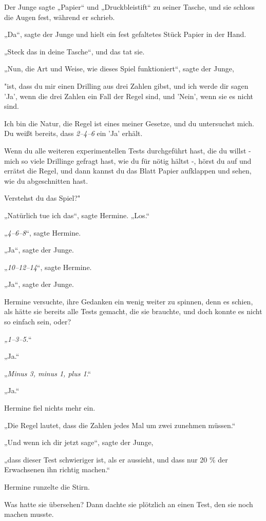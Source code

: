{Der Junge sagte „Papier“ und „Druckbleistift“ zu seiner Tasche, und sie schloss die Augen fest, während er schrieb.

„Da“, sagte der Junge und hielt ein fest gefaltetes Stück Papier in der Hand.

„Steck das in deine Tasche“, und das tat sie.

„Nun, die Art und Weise, wie dieses Spiel funktioniert“, sagte der Junge,

"ist, dass du mir einen Drilling aus drei Zahlen gibst, und ich werde dir sagen 'Ja', wenn die drei Zahlen ein Fall der Regel sind, und 'Nein', wenn sie es nicht sind.

Ich bin die Natur, die Regel ist eines meiner Gesetze, und du untersuchst mich. Du weißt bereits, dass \emph{2–4–6} ein 'Ja' erhält.

Wenn du alle weiteren experimentellen Tests durchgeführt hast, die du willst - mich so viele Drillinge gefragt hast, wie du für nötig hältst -, hörst du auf und errätst die Regel, und dann kannst du das Blatt Papier aufklappen und sehen, wie du abgeschnitten hast.

Verstehst du das Spiel?"

„Natürlich tue ich das“, sagte Hermine. „Los.“

„\emph{4–6–8}“, sagte Hermine.

„Ja“, sagte der Junge.

„\emph{10–12–14}“, sagte Hermine.

„Ja“, sagte der Junge.

Hermine versuchte, ihre Gedanken ein wenig weiter zu spinnen, denn es schien, als hätte sie bereits alle Tests gemacht, die sie brauchte, und doch konnte es nicht so einfach sein, oder?

\emph{„1–3–5.}“

„Ja.“

„\emph{Minus 3, minus 1, plus 1}.“

„Ja.“

Hermine fiel nichts mehr ein.

„Die Regel lautet, dass die Zahlen jedes Mal um zwei zunehmen müssen.“

„Und wenn ich dir jetzt sage“, sagte der Junge,

„dass dieser Test schwieriger ist, als er aussieht, und dass nur 20 \% der Erwachsenen ihn richtig machen.“

Hermine runzelte die Stirn.

Was hatte sie übersehen? Dann dachte sie plötzlich an einen Test, den sie noch machen musste.

}
